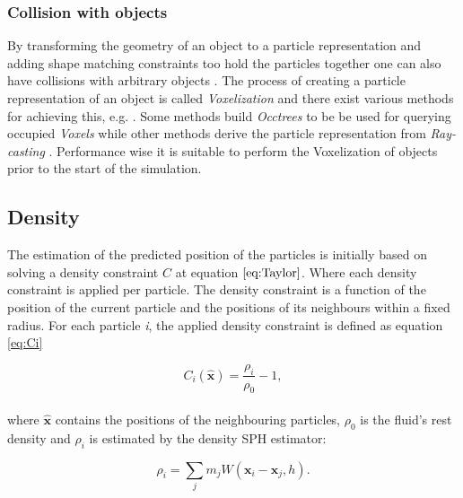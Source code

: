 \subsubsection{Collision with objects}

By transforming the geometry of an object to a particle representation and adding shape matching constraints too hold the particles together one can also have collisions with arbitrary objects \cite{muller2005meshless, macklin2014unified}. The process of creating a particle representation of an object is called \textit{Voxelization} and there exist various methods for achieving this, e.g. \cite{VoxPolygon, VoxSingle}. Some methods build \textit{Occtrees} to be be used for querying occupied \textit{Voxels} while other methods derive the particle representation from \textit{Ray-casting} \cite{VoxSingle}. Performance wise it is suitable to perform the Voxelization of objects prior to the start of the simulation.


\subsection{Density}

The estimation of the predicted position of the particles is initially based on solving a density constraint $C$ at equation $\ref{eq:Taylor}$. Where each density constraint is applied per particle. The density constraint is a function of the position of the current particle and the positions of its neighbours within a fixed radius. For each particle \textit{i}, the applied density constraint is defined as equation \ref{eq:Ci}

\begin{equation}
\label{eq:Ci}
C_i(\hat{\mathbf{x}}) = \frac{\rho_i}{\rho_0} - 1,
\end{equation}
\\
where $\hat{\mathbf{x}}$ contains the positions of the neighbouring particles, $\rho_0$ is the fluid's rest density and $\rho_i$ is estimated by the density SPH estimator:

\begin{equation}
\label{eq:Rhoi}
\rho_i = \sum\limits_{j} m_j W(\mathbf{x}_i - \mathbf{x}_j, h).
\end{equation}

